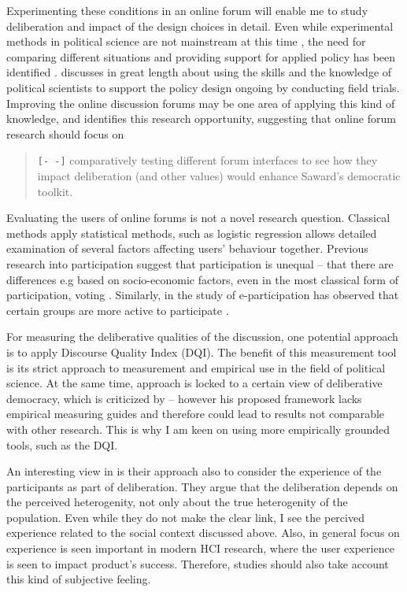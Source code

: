 \documentclass[journal,a4paper]{IEEEtran}
\begin{document}
Experimenting these conditions in an online forum will enable me to study deliberation and impact of the design choices in detail. Even while experimental methods in political science are not mainstream at this time \cite{green03,druckman06}, the need for comparing different situations and providing support for applied policy has been identified \cite{stoker10}.  discusses in great length about using the skills and the knowledge of political scientists to support the policy design ongoing by conducting field trials. Improving the online discussion forums may be one area of applying this kind of knowledge, and  identifies this research opportunity, suggesting that online forum research should focus on

\begin{quote}
\texttt{[- -]} comparatively testing different forum interfaces to see how they impact deliberation (and other values) would 
enhance Saward’s democratic toolkit.
\end{quote}

Evaluating the users of online forums is not a novel research question. Classical methods apply statistical methods, such as logistic regression allows detailed examination of several factors affecting users' behaviour together. Previous research into participation suggest that participation is unequal -- that there are differences e.g  based on socio-economic factors, even in the most classical form of participation, voting . Similarly, in the study of e-participation has observed that certain groups are more active to participate .

For measuring the deliberative qualities of the discussion, one potential approach is to apply  Discourse Quality Index (DQI). The benefit of this measurement tool is its strict approach to measurement and empirical use in the field of political science. At the same time,  approach is locked to a certain view of deliberative democracy, which is criticized by  -- however his proposed framework lacks empirical measuring guides and therefore could lead to results not comparable with other research. This is why I am keen on using more empirically grounded tools, such as the DQI.

An interesting view in  is their approach also to consider the experience of the participants as part of deliberation. They argue that the deliberation depends on the perceived heterogenity, not only about the true heterogenity of the population. Even while they do not make the clear link, I see the percived experience related to the social context discussed above. Also, in general focus on experience is seen important in modern HCI research, where the user experience is seen to impact product's success. Therefore, studies should also take account this kind of subjective feeling.
\end{document}

